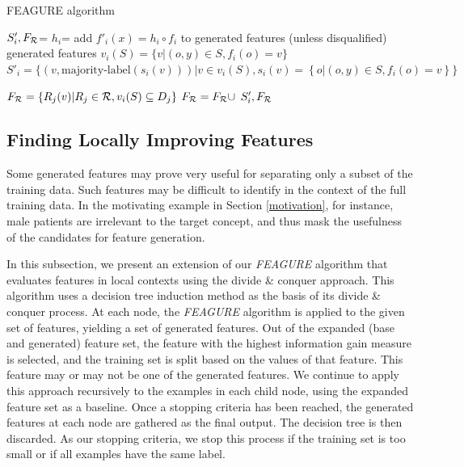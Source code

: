 \documentclass[twoside,11pt]{article}
\theoremstyle{definition}
\begin{document}
\begin{algorithm}[H]
	\caption{FEAGURE algorithm}
	\label{code-creating-prob}
	\small
	\begin{algorithmic}
		\State $S'_i,F_{\cal R}$=  %
		\State $h_i$=  
		\State add $f'_i(x)=h_i\circ f_i$ to generated features (unless disqualified)
		\EndFor
		\State \Return generated features
		\EndFunction
		\State 
		\State $v_i(S) = \{v | (o,y) \in S, f_{i}(o)=v\}$
		\State		$S'_i =  \{ (v, \mbox{majority-label}(s_i(v))) | v \in v_i(S),		 s_i(v)=\left \{o | (o,y)\in S, f_{i}(o)=v \right \}  \} $
		
		
		\State $F_{\cal R}=\{R_j(v)| R_j\in{\cal R}, v_i(S)\subseteq D_j\}$
		\State $F_{\cal R}=F_{\cal R}\cup$
		\EndIf
		\State \Return $S'_i, F_{\cal R}$ 
		\EndFunction
		
	\end{algorithmic}
\end{algorithm}

\subsection{Finding Locally Improving Features} \label{tree_usage}

Some generated features may prove very useful for separating only a subset of the training data. Such features may be difficult to identify in the context of the full training data. In the motivating example in Section \ref{motivation}, for instance, male patients are irrelevant to the target concept, and thus mask the usefulness of the candidates for feature generation.

In this subsection, we present an extension of our \emph{FEAGURE} algorithm that evaluates features in local contexts using the divide \& conquer approach.
This algorithm uses a decision tree induction method as the basis of its divide \& conquer process. At each node, the \emph{FEAGURE} algorithm is applied to the given set of features, yielding a set of generated features. Out of the expanded (base and generated) feature set, the feature with the highest information gain measure \cite{quinlan1986} is selected, and the training set is split based on the values of that feature. This feature may or may not be one of the generated features. We continue to apply this approach recursively to the examples in each child node, using the expanded feature set as a baseline.
Once a stopping criteria has been reached, the generated features at each node are gathered as the final output. The decision tree is then discarded.
As our stopping criteria, we stop this process if the training set is too small or if all examples have the same label.
\end{document}
